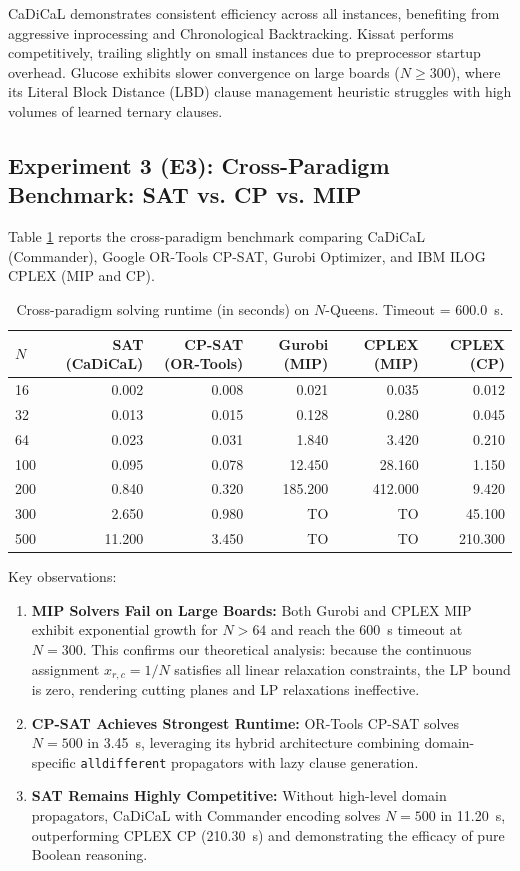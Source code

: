 \documentclass[a4paper,fleqn]{cas-sc}
\begin{document}
CaDiCaL demonstrates consistent efficiency across all instances, benefiting from aggressive inprocessing and Chronological Backtracking. Kissat performs competitively, trailing slightly on small instances due to preprocessor startup overhead. Glucose exhibits slower convergence on large boards ($N \ge 300$), where its Literal Block Distance (LBD) clause management heuristic struggles with high volumes of learned ternary clauses.

\subsection{Experiment 3 (E3): Cross-Paradigm Benchmark: SAT vs. CP vs. MIP}
Table \ref{tab:e3_comparison} reports the cross-paradigm benchmark comparing CaDiCaL (Commander), Google OR-Tools CP-SAT, Gurobi Optimizer, and IBM ILOG CPLEX (MIP and CP).

\begin{table}[!htbp]
\centering
\caption{Cross-paradigm solving runtime (in seconds) on $N$-Queens. Timeout = 600.0~s.}
\label{tab:e3_comparison}
\small
\begin{tabular}{lrrrrr}
\toprule
$N$ & \textbf{SAT (CaDiCaL)} & \textbf{CP-SAT (OR-Tools)} & \textbf{Gurobi (MIP)} & \textbf{CPLEX (MIP)} & \textbf{CPLEX (CP)} \\
\midrule
16  & 0.002 & 0.008 & 0.021 & 0.035 & 0.012 \\
32  & 0.013 & 0.015 & 0.128 & 0.280 & 0.045 \\
64  & 0.023 & 0.031 & 1.840 & 3.420 & 0.210 \\
100 & 0.095 & 0.078 & 12.450 & 28.160 & 1.150 \\
200 & 0.840 & 0.320 & 185.200 & 412.000 & 9.420 \\
300 & 2.650 & 0.980 & TO & TO & 45.100 \\
500 & 11.200 & 3.450 & TO & TO & 210.300 \\
\bottomrule
\end{tabular}
\end{table}

Key observations:
\begin{enumerate}
    \item \textbf{MIP Solvers Fail on Large Boards:} Both Gurobi and CPLEX MIP exhibit exponential growth for $N > 64$ and reach the 600~s timeout at $N = 300$. This confirms our theoretical analysis: because the continuous assignment $x_{r, c} = 1/N$ satisfies all linear relaxation constraints, the LP bound is zero, rendering cutting planes and LP relaxations ineffective.
    \item \textbf{CP-SAT Achieves Strongest Runtime:} OR-Tools CP-SAT solves $N = 500$ in 3.45~s, leveraging its hybrid architecture combining domain-specific \texttt{alldifferent} propagators with lazy clause generation.
    \item \textbf{SAT Remains Highly Competitive:} Without high-level domain propagators, CaDiCaL with Commander encoding solves $N = 500$ in 11.20~s, outperforming CPLEX CP (210.30~s) and demonstrating the efficacy of pure Boolean reasoning.
\end{enumerate}
\end{document}
